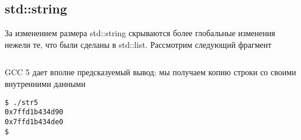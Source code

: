 \documentclass[14pt,a4paper]{article}
\begin{document}






\subsection{std::string}

За изменением размера std::string скрываются более глобальные
изменения нежели те, что были сделаны в std::list. 
Рассмотрим следующий фрагмент
\inputminted{c++}{./src/str.cpp}

GCC 5 дает вполне предсказуемый вывод: мы получаем копию строки со
своими внутренними данными
\begin{verbatim}
$ ./str5
0x7ffd1b434d90
0x7ffd1b434de0
$
\end{verbatim}
\end{document}
